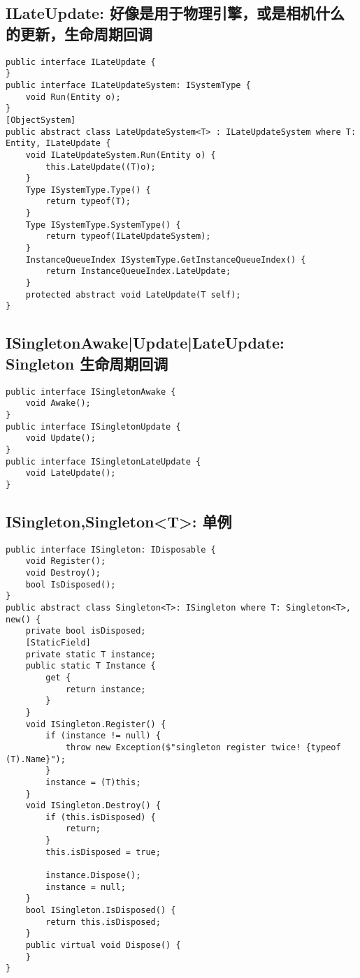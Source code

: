 \documentclass[9pt, b5paper]{article}
\begin{document}
\subsection{ILateUpdate: 好像是用于物理引擎，或是相机什么的更新，生命周期回调}
\label{sec-1-9}
\begin{verbatim}
public interface ILateUpdate {
}
public interface ILateUpdateSystem: ISystemType {
    void Run(Entity o);
}
[ObjectSystem]
public abstract class LateUpdateSystem<T> : ILateUpdateSystem where T: Entity, ILateUpdate {
    void ILateUpdateSystem.Run(Entity o) {
        this.LateUpdate((T)o);
    }
    Type ISystemType.Type() {
        return typeof(T);
    }
    Type ISystemType.SystemType() {
        return typeof(ILateUpdateSystem);
    }
    InstanceQueueIndex ISystemType.GetInstanceQueueIndex() {
        return InstanceQueueIndex.LateUpdate;
    }
    protected abstract void LateUpdate(T self);
}
\end{verbatim}
\subsection{ISingletonAwake|Update|LateUpdate: Singleton 生命周期回调}
\label{sec-1-10}
\begin{verbatim}
public interface ISingletonAwake {
    void Awake();
}
public interface ISingletonUpdate {
    void Update();
}
public interface ISingletonLateUpdate {
    void LateUpdate();
}
\end{verbatim}
\subsection{ISingleton,Singleton<T>: 单例}
\label{sec-1-11}
\begin{verbatim}
public interface ISingleton: IDisposable {
    void Register();
    void Destroy();
    bool IsDisposed();
}
public abstract class Singleton<T>: ISingleton where T: Singleton<T>, new() {
    private bool isDisposed;
    [StaticField]
    private static T instance;
    public static T Instance {
        get {
            return instance;
        }
    }
    void ISingleton.Register() {
        if (instance != null) {
            throw new Exception($"singleton register twice! {typeof (T).Name}");
        }
        instance = (T)this;
    }
    void ISingleton.Destroy() {
        if (this.isDisposed) {
            return;
        }
        this.isDisposed = true;

        instance.Dispose();
        instance = null;
    }
    bool ISingleton.IsDisposed() {
        return this.isDisposed;
    }
    public virtual void Dispose() {
    }
}
\end{verbatim}
\end{document}
